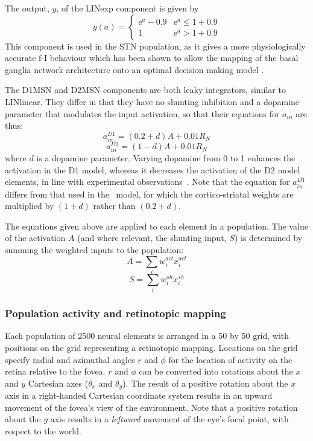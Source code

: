 \documentclass{frontiersSCNS}
\begin{document}
The output, $y$, of the LINexp component is given by
\[
   y(a) = \begin{cases}
      \mathrm{e}^{a}-0.9   & \mathrm{e}^a \leq 1+0.9 \\
      1   & \mathrm{e}^a > 1+0.9
   \end{cases}
\]
This component is used in the STN population, as it gives a more
physiologically accurate f-I
behaviour 
which has been shown to allow the mapping of the basal ganglia network
architecture onto an optimal decision making
model .

The D1MSN and D2MSN components are both leaky integrators, similar to
LINlinear. They differ in that they have no shunting inhibition and a
dopamine parameter that modulates the input activation, so
that their equations for $a_{in}$ are thus:
\[
   a_{in}^{D1} = (0.2 + d)A + 0.01 R_N
\]
\[
   a_{in}^{D2} = (1 - d)A + 0.01 R_N
\]
where $d$ is a dopamine parameter. Varying dopamine from 0 to 1
enhances the activation in the D1 model, whereas it decreases
the activation of the D2 model elements, in line with experimental
observations~\cite{refs}. Note that the equation for $a_{in}^{D1}$
differs from that used in the \ccg~model, for which the
cortico-striatal weights are multiplied by $(1+d)$ rather than
$(0.2+d)$.

The equations given above are applied to each element in a
population. The value of the activation $A$ (and where relevant, the
shunting input, $S$) is determined by summing the weighted
inputs to the population:
\[
A = \sum_{i}w_i^{act} x_i^{act}
\]
\[
S = \sum_{i}w_i^{sh} x_i^{sh}
\]

%
%

\subsubsection{Population activity and retinotopic mapping}

Each population of 2500 neural elements is arranged in a 50 by 50
grid, with positions on the grid representing a retinotopic
mapping. Locations on the grid specify radial and azimuthal angles $r$
and $\phi$ for the location of activity on the retina relative to the
fovea. $r$ and $\phi$ can be converted into rotations about the $x$ and
$y$ Cartesian axes ($\theta_x$ and $\theta_y$). The result of a
positive rotation about the $x$ axis in a right-handed Cartesian
coordinate system results in an upward movement of the fovea's view
of the environment. Note that a positive rotation about the $y$ axis
results in a \emph{leftward} movement of the eye's focal point, with
respect to the world.
\end{document}
